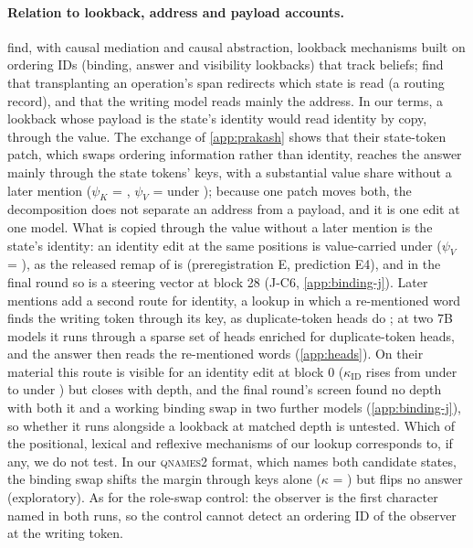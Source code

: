 \paragraph{Relation to lookback, address and payload accounts.}
\citet{prakash2025lookbacks} find, with causal mediation and causal abstraction, lookback mechanisms built on ordering IDs (binding, answer and visibility lookbacks) that track beliefs; \citet{wu2026record} find that transplanting an operation's span redirects which state is read (a routing record), and that the writing model reads mainly the address. In our terms, a lookback whose payload is the state's identity would read identity by copy, through the value. The exchange of \cref{app:prakash} shows that their state-token patch, which swaps ordering information rather than identity, reaches the answer mainly through the state tokens' keys, with a substantial value share without a later mention ($\psi_K$ = \PkPsiKBindNone{}, $\psi_V$ = \PkPsiVBindNone{} under \fmtNone{}); because one patch moves both, the decomposition does not separate an address from a payload, and it is one edit at one model. What is copied through the value without a later mention is the state's identity: an identity edit at the same positions is value-carried under \fmtNone{} ($\psi_V$ = \PkPsiVIdZeroNone{}), as the released remap of \citet{anonymous2026fitted} is (preregistration E, prediction E4), and in the final round so is a steering vector at block 28 (J-C6, \cref{app:binding-j}). Later mentions add a second route for identity, a lookup in which a re-mentioned word finds the writing token through its key, as duplicate-token heads do \citep{wang2022ioi}; at two 7B models it runs through a sparse set of heads enriched for duplicate-token heads, and the answer then reads the re-mentioned words (\cref{app:heads}). On their material this route is visible for an identity edit at block 0 ($\kappa_{\mathrm{ID}}$ rises from \PkKappaIdZeroNone{} under \fmtNone{} to \PkKappaIdZeroOpt{} under \fmtOpt{}) but closes with depth, and the final round's screen found no depth with both it and a working binding swap in two further models (\cref{app:binding-j}), so whether it runs alongside a lookback at matched depth is untested. Which of the positional, lexical and reflexive mechanisms of \citet{gurarieh2025mixing} our lookup corresponds to, if any, we do not test. In our \textsc{qnames2} format, which names both candidate states, the binding swap shifts the margin through keys alone ($\kappa$ = \PkKappaBindQnamestwo{}) but flips no answer (exploratory). As for the role-swap control: the observer is the first character named in both runs, so the control cannot detect an ordering ID of the observer at the writing token.

